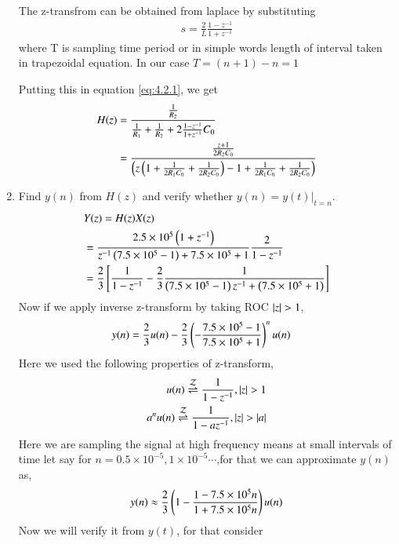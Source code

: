 \documentclass[journal,12pt,twocolumn]{IEEEtran}
\renewcommand\thesection{\arabic{section}}
\begin{document}
\begin{enumerate}[label=\arabic*.,ref=\thesection.\theenumi]
		\solution The z-transfrom can be obtained from laplace by substituting
		\begin{align}
			s=\frac{2}{L}\frac{1-z^{-1}}{1+z^{-1}}
		\end{align}
		where T is sampling time period or in simple words length of interval taken in trapezoidal equation. In our case $T=(n+1)-n=1$

		Putting this in equation \eqref{eq:4.2.1}, we get
		\begin{align}
			H(z)&=\frac{\frac{1}{R_2}}{\frac{1}{R_1}+\frac{1}{R_2}+2\frac{1-z^{-1}}{1+z^{-1}}C_0}\\
			&=\frac{\frac{z+1}{2R_2C_0}}{\left(z\left(1+\frac{1}{2R_1C_0}+\frac{1}{2R_2C_0}\right)-1+\frac{1}{2R_1C_0}+\frac{1}{2R_2C_0}\right)}
		\end{align}


\item Find $y(n)$ from $H(z)$ and verify whether $y(n) = y(t)\vert_{t = n}$.\\
	 \solution 
	 \begin{align}
		 &Y(z) = H(z)X(z) \\
		      &= \frac{2.5 \times 10^5\left(1 + z^{-1}\right)}{z^{-1}\left(7.5 \times10^5 -1\right) + 7.5\times 10^5 + 1}\frac{2}{1 - z^{-1}} \\
		      &= \frac{2}{3}{}\left[\frac{1}{1-z^{-1}} - \frac{2}{3} \frac{1}{\left(7.5 \times 10^5 - 1\right)z^{-1} + \left(7.5 \times 10^5 +1\right)}\right]
	 \end{align}
	 Now if we apply inverse z-transform by taking ROC $\left\vert z\right\vert > 1$,
	  \begin{align}
		  y(n) &= \frac{2}{3}u(n) - \frac{2}{3}\left(-\frac{7.5 \times 10^5 -1}{7.5 \times 10^5 + 1}\right)^nu(n)
	  \end{align}
	  Here we used the following properties of z-transform,
	   \begin{align}
		   u(n) \overset{\mathcal{Z}}{ \rightleftharpoons} \frac{1}{1-z^{-1}} , \left\vert z\right\vert > 1\\
		   a^{n}u(n) \overset{\mathcal{Z}}{ \rightleftharpoons} \frac{1}{1 - az^{-1}} ,\left\vert z\right\vert >\left\vert a\right\vert
	   \end{align}
	   Here we are sampling the signal at high frequency means at small intervals of time let say for $n = 0.5 \times 10^{-5} , 1 \times 10^{-5} \cdots$,for that we can approximate $y(n)$ as,
	    \begin{align}
		    y(n) \approx \frac{2}{3}\left( 1 - \frac{1 - 7.5 \times 10^5n}{1 + 7.5\times 10^5n}\right)u(n)
	    \end{align}
            Now we will verify it from $y(t)$, for that consider
	     \begin{align}

\end{align}
\end{enumerate}
\end{document}
